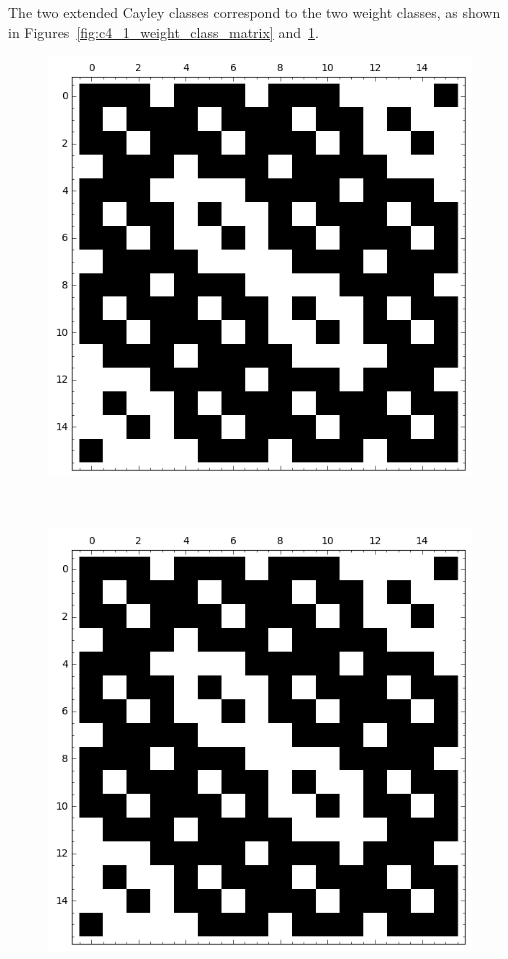 \documentclass[12pt,a4paper]{article}
\begin{document}
The two extended Cayley classes correspond to the two weight classes,
as shown in Figures~\ref{fig:c4_1_weight_class_matrix} and~\ref{fig:c4_1_bent_cayley_graph_index_matrix}.

\begin{figure}[!bhpt] %
\centering
\begin{minipage}{.48\textwidth}
  \centering
  \includegraphics[width=.9\linewidth]{../matrix_plot/re4_1_weight_class_matrix.png}
  \label{fig:c4_1_weight_class_matrix}
\end{minipage}%
~~~~
\begin{minipage}{.48\textwidth}
  \centering
  \includegraphics[width=.9\linewidth]{../matrix_plot/re4_1_bent_cayley_graph_index_matrix.png}
  \label{fig:c4_1_bent_cayley_graph_index_matrix}
\end{minipage}
\end{figure}
\end{document}
